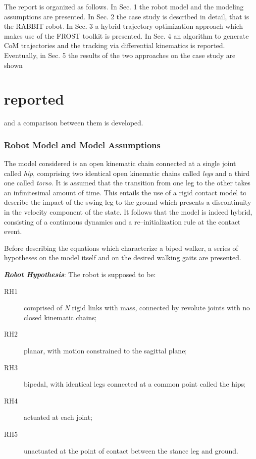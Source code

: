 \documentclass[11pt]{article}
\begin{document}
The report is organized as follows. In Sec. 1 the robot model and the modeling assumptions are presented. In Sec. 2 the case study is described in detail, that is the RABBIT robot. In Sec. 3 a hybrid trajectory optimization approach which makes use of the FROST toolkit is presented. In Sec. 4 an algorithm to generate CoM trajectories and the tracking via differential kinematics is reported. Eventually, in Sec. 5 the results of the two approaches on the case study are shown\part{reported} and a comparison between them is developed.

\section{Robot Model and Model Assumptions}

The model considered is an open kinematic chain connected at a single joint called \textit{hip}, comprising two identical open kinematic chains called \textit{legs} and a third one called \textit{torso}. It is assumed that the transition from one leg to the other takes an infinitesimal amount of time. This entails the use of a rigid contact model to describe the impact of the swing leg to the ground which presents a discontinuity in the velocity component of the state. It follows that the model is indeed hybrid, consisting of a continuous dynamics and a re--initialization rule at the contact event.

Before describing the equations which characterize a biped walker, a series of hypotheses on the model itself and on the desired walking gaits are presented.

\textit{\textbf{Robot Hypothesis}}: The robot is supposed to be:
\begin{description}
\item[RH1] comprised of \textit{N} rigid links with mass, connected by revolute joints with no closed kinematic chains;
\item[RH2] planar, with motion constrained to the sagittal plane;
\item[RH3] bipedal, with identical legs connected at a common point called the hips;
\item[RH4] actuated at each joint;
\item[RH5] unactuated at the point of contact between the stance leg and ground.
\end{description}
\end{document}

